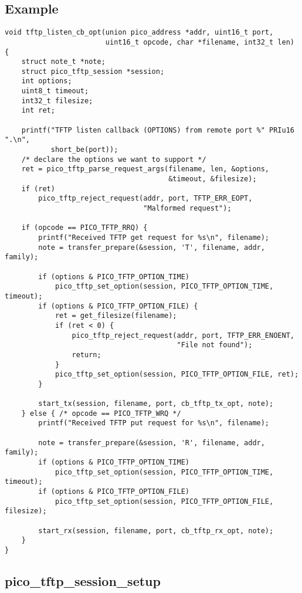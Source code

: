 \subsection*{Example}
\begin{verbatim}
void tftp_listen_cb_opt(union pico_address *addr, uint16_t port,
                        uint16_t opcode, char *filename, int32_t len)
{
    struct note_t *note;
    struct pico_tftp_session *session;
    int options;
    uint8_t timeout;
    int32_t filesize;
    int ret;

    printf("TFTP listen callback (OPTIONS) from remote port %" PRIu16 ".\n",
           short_be(port));
    /* declare the options we want to support */
    ret = pico_tftp_parse_request_args(filename, len, &options,
                                       &timeout, &filesize);
    if (ret)
        pico_tftp_reject_request(addr, port, TFTP_ERR_EOPT,
                                 "Malformed request");

    if (opcode == PICO_TFTP_RRQ) {
        printf("Received TFTP get request for %s\n", filename);
        note = transfer_prepare(&session, 'T', filename, addr, family);

        if (options & PICO_TFTP_OPTION_TIME)
            pico_tftp_set_option(session, PICO_TFTP_OPTION_TIME, timeout);
        if (options & PICO_TFTP_OPTION_FILE) {
            ret = get_filesize(filename);
            if (ret < 0) {
                pico_tftp_reject_request(addr, port, TFTP_ERR_ENOENT,
                                         "File not found");
                return;
            }
            pico_tftp_set_option(session, PICO_TFTP_OPTION_FILE, ret);
        }

        start_tx(session, filename, port, cb_tftp_tx_opt, note);
    } else { /* opcode == PICO_TFTP_WRQ */
        printf("Received TFTP put request for %s\n", filename);

        note = transfer_prepare(&session, 'R', filename, addr, family);
        if (options & PICO_TFTP_OPTION_TIME)
            pico_tftp_set_option(session, PICO_TFTP_OPTION_TIME, timeout);
        if (options & PICO_TFTP_OPTION_FILE)
            pico_tftp_set_option(session, PICO_TFTP_OPTION_FILE, filesize);

        start_rx(session, filename, port, cb_tftp_rx_opt, note);
    }
}
\end{verbatim}


\subsection{pico\_tftp\_session\_setup}

